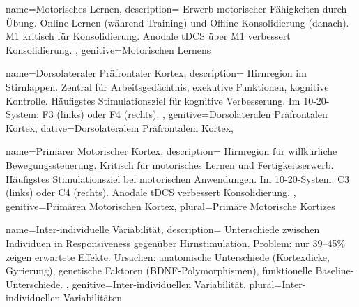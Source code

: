 {
	name=Motorisches Lernen,
	description={
			Erwerb motorischer Fähigkeiten durch Übung. Online-Lernen (während Training) und Offline-Konsolidierung (danach). \gls{M1} kritisch für Konsolidierung. Anodale \gls{tDCS} über M1 verbessert Konsolidierung. \cite{reis_noninvasive_2009}
		},
	genitive=Motorischen Lernens
}


{
	name=Dorsolateraler Präfrontaler Kortex,
	description={
			Hirnregion im Stirnlappen. Zentral für Arbeitsgedächtnis, exekutive Funktionen, kognitive Kontrolle. Häufigstes Stimulationsziel für kognitive Verbesserung. Im 10-20-System: F3 (links) oder F4 (rechts). \cite{hoy_enhancement_2016, woods_technical_2016}
		},
	genitive=Dorsolateralen Präfrontalen Kortex,
	dative=Dorsolateralem Präfrontalem Kortex,
}


{
	name=Primärer Motorischer Kortex,
	description={
			Hirnregion für willkürliche Bewegungssteuerung. Kritisch für motorisches Lernen und Fertigkeitserwerb. Häufigstes Stimulationsziel bei motorischen Anwendungen. Im 10-20-System: C3 (links) oder C4 (rechts). Anodale \gls{tDCS} verbessert Konsolidierung. \cite{reis_noninvasive_2009}
		},
	genitive=Primären Motorischen Kortex,
	plural=Primäre Motorische Kortizes
}

\iffalse

	{
		name=Inter-individuelle Variabilität,
		description={
				Unterschiede zwischen Individuen in Responsiveness gegenüber Hirnstimulation. Problem: nur 39--45\% zeigen erwartete Effekte. Ursachen: anatomische Unterschiede (Kortexdicke, Gyrierung), genetische Faktoren (\gls{BDNF}-Polymorphismen), funktionelle Baseline-Unterschiede. \cite{vergallito_inter-individual_2022, chew_inter-_2015}
			},
		genitive=Inter-individuellen Variabilität,
		plural=Inter-individuellen Variabilitäten
	}

